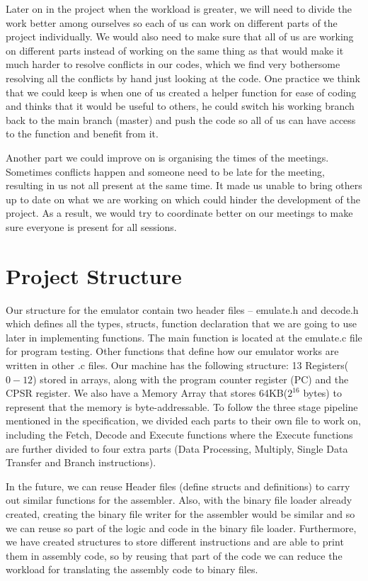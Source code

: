 \documentclass[11pt]{article}
\begin{document}
Later on in the project when the workload is greater, we will need to divide the work better among ourselves so each of us can work on different parts of the project individually. We would also need to make sure that all of us are working on different parts instead of working on the same thing as that would make it much harder to resolve conflicts in our codes, which we find very bothersome resolving all the conflicts by hand just looking at the code.  One practice we think that we could keep is when one of us created a helper function for ease of coding and thinks that it would be useful to others, he could switch his working branch back to the main branch (master) and push the code so all of us can have access to the function and benefit from it.
 
Another part we could improve on is organising the times of the meetings. Sometimes conflicts happen and someone need to be late for the meeting, resulting in us not all present at the same time. It made us unable to bring others up to date on what we are working on which could hinder the development of the project. As a result, we would try to coordinate better on our meetings to make sure everyone is present for all sessions.

\section{Project Structure}

Our structure for the emulator contain two header files – emulate.h and decode.h which defines all the types, structs, function declaration that we are going to use later in implementing functions. The main function is located at the emulate.c file for program testing. Other functions that define how our emulator works are written in other .c files.
Our machine has the following structure: 13 Registers($0 - 12$) stored in arrays, along with the program counter register (PC) and the CPSR register. We also have a Memory Array that stores 64KB($2^{16}$ bytes) to represent that the memory is byte-addressable. 
To follow the three stage pipeline mentioned in the specification, we divided each parts to their own file to work on, including the Fetch, Decode and Execute functions where the Execute functions are further divided to four extra parts (Data Processing, Multiply, Single Data Transfer and Branch instructions).
 
In the future, we can reuse Header files (define structs and definitions) to carry out similar functions for the assembler. Also, with the binary file loader already created, creating the binary file writer for the assembler would be similar and so we can reuse so part of the logic and code in the binary file loader. Furthermore, we have created structures to store different instructions and are able to print them in assembly code, so by reusing that part of the code we can reduce the workload for translating the assembly code to binary files.
\end{document}
